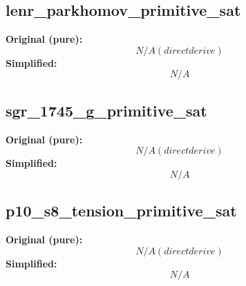 \subsection{lenr_parkhomov_primitive_sat}
\textbf{Original (pure):}
\begin{equation}
N/A (direct derive)
\end{equation}
\textbf{Simplified:}
\begin{equation}
N/A
\end{equation}

\subsection{sgr_1745_g_primitive_sat}
\textbf{Original (pure):}
\begin{equation}
N/A (direct derive)
\end{equation}
\textbf{Simplified:}
\begin{equation}
N/A
\end{equation}

\subsection{p10_s8_tension_primitive_sat}
\textbf{Original (pure):}
\begin{equation}
N/A (direct derive)
\end{equation}
\textbf{Simplified:}
\begin{equation}
N/A
\end{equation}
